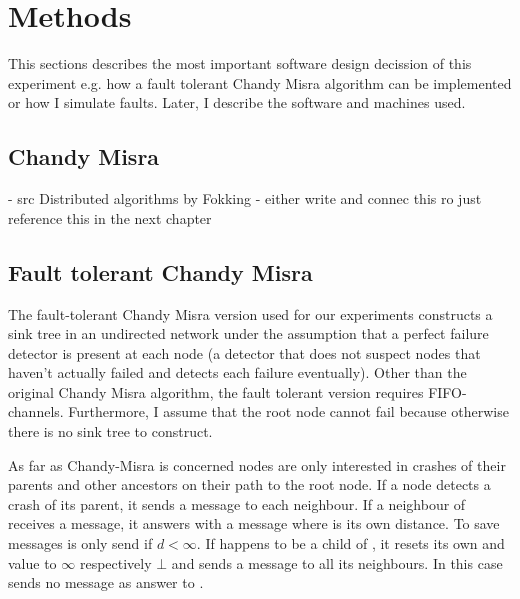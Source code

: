 \section{Methods}
\label{sec:methods}
This sections describes the most important software design decission of this experiment e.g. how a fault tolerant Chandy Misra algorithm can be implemented or how I simulate faults.
Later, I describe the software and machines used.
\subsection{Chandy Misra}
- src Distributed algorithms by Fokking
- either write and connec this ro just reference this in the next chapter
\subsection {Fault tolerant Chandy Misra}
\label{ssec:fault-tolerant-chandy-misra}
The fault-tolerant Chandy Misra version used for our experiments constructs a sink tree in an undirected network under the assumption that a perfect failure detector is present at each node (a detector that does not suspect nodes that haven't actually failed and detects each failure eventually). 
Other than the original Chandy Misra algorithm, the fault tolerant version requires FIFO-channels.
Furthermore, I assume that the root node cannot fail because otherwise there is no sink tree to construct.

As far as Chandy-Misra is concerned nodes are only interested in crashes of their parents and other ancestors on their path to the root node.
If a node  detects a crash of its parent, it sends a  message to each neighbour. 
If a neighbour  of  receives a  message, it answers with a  message where  is its own distance. 
To save messages  is only send if $d < \infty $.
If  happens to be a child of , it resets its own  and  value to $\infty$ respectively $\bot$ and sends a  message to all its neighbours. In this case  sends no  message as answer to .

